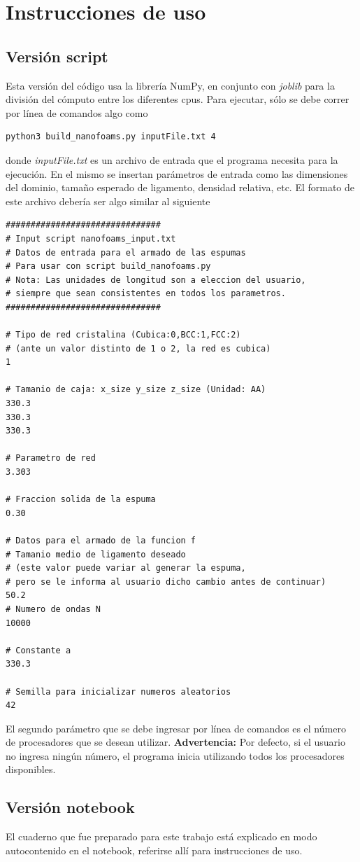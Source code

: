 \documentclass{article}
\begin{document}
\section{Instrucciones de uso}

\subsection{Versión script}

Esta versión del código usa la librería NumPy, en conjunto con \textit{joblib} para la división del cómputo entre los diferentes cpus. Para ejecutar, sólo se debe correr por línea de comandos algo como

\lstset{language=Bash}
\begin{lstlisting}[frame=single]
python3 build_nanofoams.py inputFile.txt 4
\end{lstlisting}

donde \textit{inputFile.txt} es un archivo de entrada que el programa necesita para la ejecución. En el mismo se insertan parámetros de entrada como las dimensiones del dominio, tamaño esperado de ligamento, densidad relativa, etc. El formato de este archivo debería ser algo similar al siguiente

\newpage

\begin{lstlisting}
###############################
# Input script nanofoams_input.txt
# Datos de entrada para el armado de las espumas
# Para usar con script build_nanofoams.py
# Nota: Las unidades de longitud son a eleccion del usuario, 
# siempre que sean consistentes en todos los parametros.
###############################

# Tipo de red cristalina (Cubica:0,BCC:1,FCC:2)
# (ante un valor distinto de 1 o 2, la red es cubica)
1

# Tamanio de caja: x_size y_size z_size (Unidad: AA)
330.3
330.3
330.3

# Parametro de red 
3.303

# Fraccion solida de la espuma
0.30

# Datos para el armado de la funcion f
# Tamanio medio de ligamento deseado 
# (este valor puede variar al generar la espuma,
# pero se le informa al usuario dicho cambio antes de continuar)
50.2
# Numero de ondas N
10000

# Constante a 
330.3

# Semilla para inicializar numeros aleatorios
42
\end{lstlisting}

El segundo parámetro que se debe ingresar por línea de comandos es el número de procesadores que se desean utilizar. \textbf{Advertencia:} Por defecto, si el usuario no ingresa ningún número, el programa inicia utilizando todos los procesadores disponibles.

\subsection{Versión notebook}

El cuaderno que fue preparado para este trabajo está explicado en modo autocontenido en el notebook, referirse allí para instrucciones de uso.

\printbibliography
\end{document}
